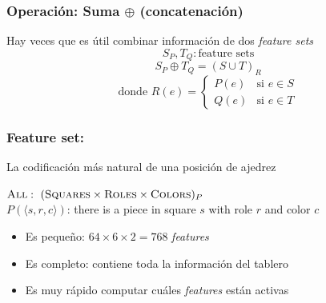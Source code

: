 \begin{frame}
\frametitle{Operación: Suma $\oplus$ (concatenación)}
Hay veces que es útil combinar información de dos \textit{feature sets} \\
\pause
\begin{equation*}
S_P, T_Q: \text{feature sets}
\end{equation*}
\begin{equation*}
S_P \oplus T_Q = {(S \cup T)}_R
\end{equation*}
\begin{equation*}
    \text{donde } R(e) = \begin{cases}
        P(e) & \text{si } e \in S \\
        Q(e) & \text{si } e \in T
    \end{cases}
\end{equation*}
\end{frame}


\begin{frame}
\frametitle{Feature set: }
La codificación más natural de una posición de ajedrez \\
\begin{center}
    $\textsc{All}:\ (\textsc{Squares} \times \textsc{Roles} \times \textsc{Colors})_{P}$ \\
    $P(\langle s, r, c \rangle)$: there is a piece in square $s$ with role $r$ and color $c$\\
\end{center}
\pause
\begin{itemize}
    \item<2-> Es pequeño: $64 \times 6 \times 2 = 768$ \textit{features}
    \item<3-> Es completo: contiene toda la información del tablero
    \item<4-> Es muy rápido computar cuáles \textit{features} están activas
\end{itemize}
\end{frame}

